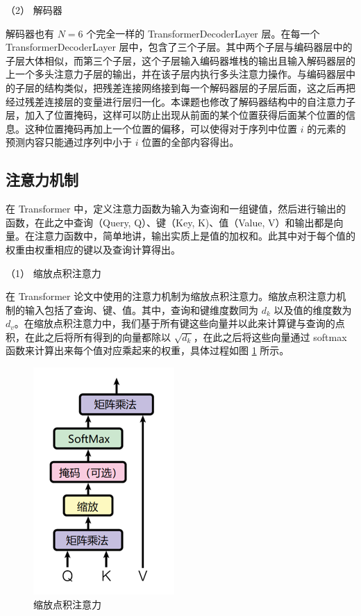 （2） 解码器

解码器也有 $N = 6$ 个完全一样的 TransformerDecoderLayer 层。在每一个 TransformerDecoderLayer 层中，包含了三个子层。其中两个子层与编码器层中的子层大体相似，而第三个子层，这个子层输入编码器堆栈的输出且输入解码器层的上一个多头注意力子层的输出，并在该子层内执行多头注意力操作。与编码器层中的子层的结构类似，把残差连接网络接到每一个解码器层的子层后面，这之后再把经过残差连接层的变量进行层归一化。本课题也修改了解码器结构中的自注意力子层，加入了位置掩码，这样可以防止出现从前面的某个位置获得后面某个位置的信息。这种位置掩码再加上一个位置的偏移，可以使得对于序列中位置 $i$ 的元素的预测内容只能通过序列中小于 $i$ 位置的全部内容得出。

\subsection{注意力机制}

在 Transformer 中，定义注意力函数为输入为查询和一组键值，然后进行输出的函数，在此之中查询（Query, Q）、键（Key, K)、值（Value, V）和输出都是向量。在注意力函数中，简单地讲，输出实质上是值的加权和。此其中对于每个值的权重由权重相应的键以及查询计算得出。

（1） 缩放点积注意力

在 Transformer 论文中使用的注意力机制为缩放点积注意力。缩放点积注意力机制的输入包括了查询、键、值。其中，查询和键维度数同为 $d_k$ 以及值的维度数为 $d_v$。在缩放点积注意力中，我们基于所有键这些向量并以此来计算键与查询的点积，在此之后将所有得到的向量都除以 $\sqrt{d_k}$，在此之后将这些向量通过 softmax 函数来计算出来每个值对应乘起来的权重，具体过程如图 \ref{fig:DotAtt} 所示。

\begin{figure}[htbp]
	\centering
	\includegraphics[scale = 0.8]{figures/DotAtt}
	\caption{缩放点积注意力}
	\label{fig:DotAtt}
\end{figure}

